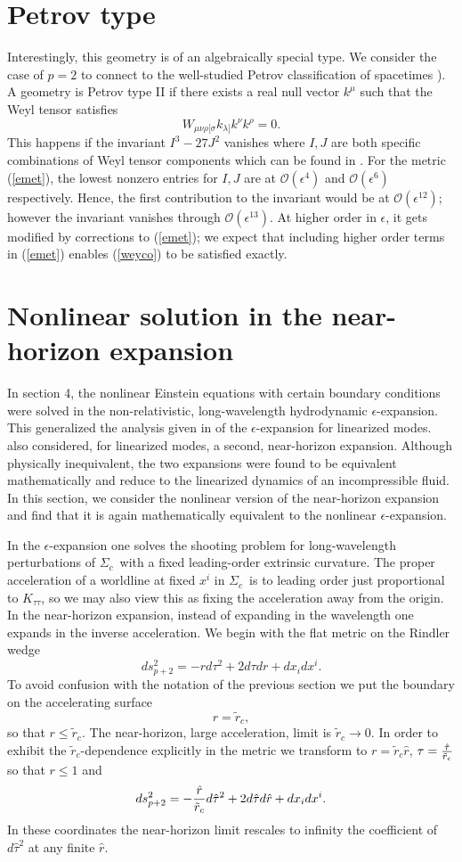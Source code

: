\documentclass{article}
\def\beq{\begin{equation}}
\def\eeq{\end{equation}}
\def\t{{ \theta}}
\def\e{{\epsilon}}
\def\sc{$\Sigma_c$}
\def\cO{\mathcal{O}}
\def\r{\hat r}
\def\t{\hat \tau}
\begin{document}
\section{Petrov type}
Interestingly, this geometry is of an algebraically special type. We consider the case of $p=2$ to connect to the well-studied Petrov classification of spacetimes \cite{exac}). A geometry is Petrov type II if there exists a real null vector $k^\mu$ such that the Weyl tensor satisfies
\beq\label{weyco}
W_{\mu\nu\rho[\sigma} k_{\lambda]}k^\nu k^\rho=0.
\eeq
This happens if the invariant $I^3 - 27 J^2$ vanishes where $I,J$ are both specific combinations of Weyl tensor components which can be found in  \cite{exac}. For the metric (\ref{emet}), the lowest nonzero entries for $I,J$ are at $\cO(\epsilon^4)$ and $\cO(\epsilon^6)$ respectively.  Hence, the first contribution to the invariant would be at $\cO(\epsilon^{12})$; however the invariant vanishes through $\cO(\e^{13})$. At higher order in $\e$, it gets modified by corrections to (\ref{emet}); we expect that including higher order terms in (\ref{emet}) enables (\ref{weyco}) to be satisfied exactly.



\section{Nonlinear solution in the near-horizon expansion}

In section 4, the nonlinear Einstein equations with certain boundary conditions were solved in the non-relativistic, long-wavelength hydrodynamic $\e$-expansion.  This generalized the analysis given in \cite{bkls} of the $\e$-expansion for linearized modes.   \cite{bkls} also considered, for linearized modes, a second, near-horizon expansion. Although physically inequivalent, the two expansions were found to be equivalent mathematically and reduce to the linearized dynamics of an incompressible fluid. In this section, we consider the nonlinear version of the near-horizon expansion and find that it is again mathematically equivalent to the nonlinear $\e$-expansion.

In the $\e$-expansion one solves the shooting problem for long-wavelength perturbations of \sc\ with a fixed leading-order extrinsic curvature.
The proper acceleration of a worldline at fixed $x^i$ in \sc\ is to leading order just proportional to $K_{\tau\tau}$, so we may also view this as fixing the  acceleration  away from the origin.  In the
near-horizon expansion, instead of expanding in the wavelength one expands in the inverse acceleration. We begin with the flat metric on the Rindler wedge
%
\beq
ds_{p+2}^2 =-r d\tau^2 + 2 d\tau dr + dx_i dx^i .
\eeq
%
To avoid confusion with the notation of the previous section we put the boundary on the accelerating surface
%
\beq
 r=\tilde r_c,
\eeq
%
so that $r\le \tilde r_c$.
The near-horizon, large acceleration,  limit is
$\tilde r_c\to 0$. In order to exhibit the $\tilde r_c$-dependence explicitly in the metric we transform to $r=\tilde r_c\r$, $\tau= {\t \over \tilde r_c}$ so that $r\le 1 $ and
%
\beq
ds_{p+2}^2 =-{\r \over \tilde r_c} d\t^2 + 2 d\t d\r + dx_i dx^i .
\eeq
%
In these coordinates the near-horizon limit rescales to infinity the coefficient of $d\t^2$ at any finite $\r$.
\end{document}
